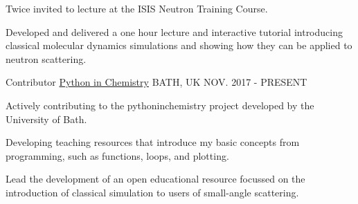 \begin{cventries}
{\begin{cvitems}
			\item {Twice invited to lecture at the ISIS Neutron Training Course.}
			\item {Developed and delivered a one hour lecture and interactive tutorial introducing classical molecular dynamics simulations and showing how they can be applied to neutron scattering.}
		\end{cvitems}
	}
	\cventry
	{Contributor}
	{\href{https://pythoninchemistry.org}{Python in Chemistry}}
	{BATH, UK}
	{NOV. 2017 - PRESENT}
	{
		\begin{cvitems}
			\item {Actively contributing to the pythoninchemistry project developed by the University of Bath.}
			\item {Developing teaching resources that introduce my basic concepts from programming, such as functions, loops, and plotting.}
			\item {Lead the development of an open educational resource focussed on the introduction of classical simulation to users of small-angle scattering.}
		\end{cvitems}
	}
\end{cventries}
